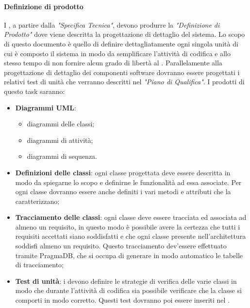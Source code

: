  \paragraph{Definizione di prodotto}\label{definizione prodotto}
 I \PJP, a partire dalla \textit{"Specifica Tecnica"}, devono produrre la \textit{"Definizione di Prodotto"} dove
viene descritta la progettazione di dettaglio del sistema. Lo scopo di questo documento è quello di
definire dettagliatamente ogni singola unità di cui è composto il sistema in modo da semplificare
l'attività di codifica e allo stesso tempo di non fornire alcun grado di libertà al \PR.
Parallelamente alla progettazione di dettaglio dei componenti software dovranno essere progettati
i relativi test di unità che verranno descritti nel  \textit{"Piano di Qualifica"}. I prodotti di questo task
saranno:
 \begin{itemize}
 	\item \textbf{Diagrammi UML}:
 	\begin{itemize}
 		\item diagrammi delle classi;
 		\item diagrammi di attività;
 		\item diagrammi di sequenza.
 	\end{itemize}
 	\item \textbf{Definizioni delle classi}: ogni classe progettata deve essere descritta in modo da spiegarne lo scopo e definirne le
 	funzionalità ad essa associate. Per ogni classe dovranno essere anche definiti i vari metodi e attributi che la caratterizzano;
 	\item \textbf{Tracciamento delle classi}: ogni classe deve essere tracciata ed associata ad almeno un requisito, in questo modo è possibile avere la certezza che tutti i requisiti accettati siano	soddisfatti e che ogni classe presente nell’architettura soddisfi almeno un requisito. Questo 	tracciamento dev’essere effettuato tramite PragmaDB, che si occupa di generare in modo automatico le tabelle di tracciamento;
 	\item \textbf{Test di unità}: i \PJP{} devono definire le strategie di verifica delle varie classi in modo che durante l’attività di codifica sia possibile verificare che la classe si comporti in modo corretto. Questi test dovranno poi essere inseriti nel .
 \end{itemize}
